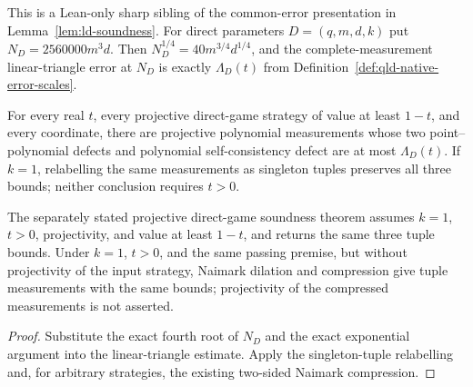 \begin{theorem}
\label{thm:qld-native-direct-soundness}
\leanok
{}
This is a Lean-only sharp sibling of the common-error presentation in
Lemma~\ref{lem:ld-soundness}.  For direct parameters $D=(q,m,d,k)$ put
$N_D=2560000m^3d$.  Then
$N_D^{1/4}=40m^{3/4}d^{1/4}$, and the complete-measurement linear-triangle
error at $N_D$ is exactly $\Lambda_D(t)$ from
Definition~\ref{def:qld-native-error-scales}.

For every real $t$, every projective direct-game strategy of value at least
$1-t$, and every coordinate, there are projective polynomial measurements
whose two point--polynomial defects and polynomial self-consistency defect are
at most $\Lambda_D(t)$.  If $k=1$, relabelling the same measurements as
singleton tuples preserves all three bounds; neither conclusion requires
$t>0$.

The separately stated projective direct-game soundness theorem assumes
$k=1$, $t>0$, projectivity, and value at least $1-t$, and returns the same
three tuple bounds.  Under $k=1$, $t>0$, and the same passing premise, but
without projectivity of the input strategy, Naimark dilation and compression
give tuple measurements with the same bounds; projectivity of the compressed
measurements is not asserted.
\end{theorem}
\begin{proof}
\leanok
{}
Substitute the exact fourth root of $N_D$ and the exact exponential argument
into the linear-triangle estimate.  Apply the singleton-tuple relabelling and,
for arbitrary strategies, the existing two-sided Naimark compression.
\end{proof}

